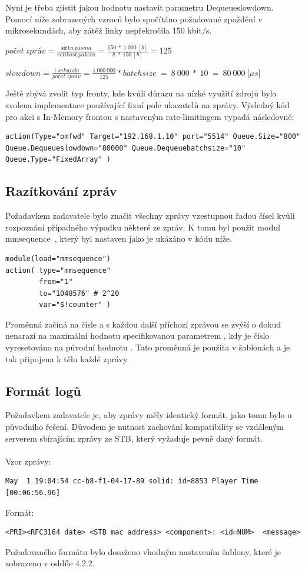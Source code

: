 \documentclass[thesis=B,czech]{FITthesis}[2012/06/26]
\begin{document}
Nyní je třeba zjistit jakou hodnotu nastavit parametru Dequeueslowdown. Pomocí níže zobrazených vzroců bylo spočítáno požadované zpoždění v mikrosekundách, aby zátěž linky nepřekročila 150 kbit/s.

\begin{description}
	\item $počet~zpráv=\frac{šířka~pásma}{velikost~paketu}=\frac{150~*~1~000~[b]}{8~*~150~[b]}=125$
	\item $slowdown=\frac{1~sekunda}{počet~zpráv}=\frac{1~000~000}{125}*batchsize~=~8~000~*~10~=~80~000~[\mu$$s]$
\end{description}
Ještě zbývá zvolit typ fronty, kde kvůli důrazu na nízké využití zdrojů byla zvolena implementace používající fixní pole ukazatelů na zprávy.
Výsledný kód pro akci s In-Memory frontou s nastaveným rate-limitingem vypadá následovně:
\begin{lstlisting}[style=RainerScriptSimpleStyle]
action(Type="omfwd" Target="192.168.1.10" port="5514" Queue.Size="800" Queue.Dequeueslowdown="80000" Queue.Dequeuebatchsize="10" Queue.Type="FixedArray" )
\end{lstlisting}

\subsection{Razítkování zpráv}
Požadavkem zadavatele bylo značit všechny zprávy vzestupnou řadou čísel kvůli rozpoznání případného výpadku některé ze zpráv.
K tomu byl použit modul mmsequence~\cite{RsyslogMmsequence}, který byl nastaven jako je ukázáno v kódu níže.
\begin{lstlisting}[style=RainerScriptSimpleStyle]
module(load="mmsequence")
action(	type="mmsequence"
		from="1"
		to="1048576" # 2^20
		var="$!counter" )
\end{lstlisting}
Proměnná  začíná na čísle  a s každou další příchozí zprávou se zvýší o  dokud nenarazí na maximální hodnotu specifikovanou parametrem , kdy je číslo vyresetováno na původní hodnotu .
Tato proměnná je použita v šablonách a je tak připojena k tělu každé zprávy.

\subsection{Formát logů}
Požadavkem zadavatele je, aby zprávy měly identický formát, jako tomu bylo u původního řešení. Důvodem je nutnost zachování kompatibility se vzdáleným serverem sbírajícím zprávy ze STB, který vyžaduje pevně daný formát.
\\
\\
Vzor zprávy:
\begin{lstlisting}[style=RainerScriptSimpleStyle]
May  1 19:04:54 cc-b8-f1-04-17-89 solid: id=8853 Player Time [00:06:56.96]
\end{lstlisting}
Formát:
\begin{lstlisting}[style=RainerScriptSimpleStyle]
<PRI><RFC3164 date> <STB mac address> <component>: <id=NUM>  <message>
\end{lstlisting}
Požadovaného formátu bylo dosaženo vhodným nastavením šablony, které je zobrazeno v oddíle 4.2.2.
\clearpage
\end{document}
